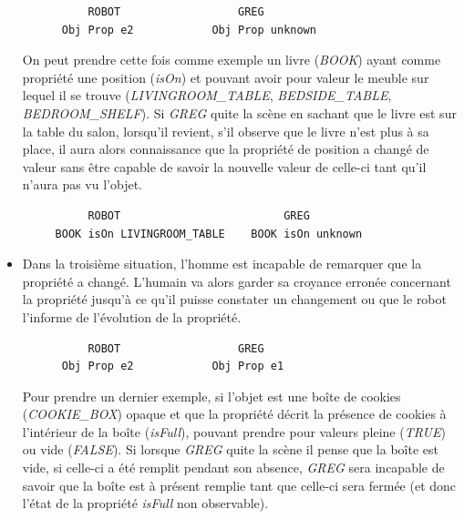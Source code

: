 \documentclass[a4paper,11pt,twoside]{StyleThese}
\begin{document}
\begin{itemize}
\begin{scriptsize}
\begin{verbatim}
          ROBOT                  GREG
      Obj Prop e2            Obj Prop unknown
\end{verbatim}
\end{scriptsize}



On peut prendre cette fois comme exemple un livre (\textit{BOOK}) ayant comme propriété une position (\textit{isOn}) et pouvant avoir pour valeur le meuble sur lequel il se trouve (\textit{LIVINGROOM\_TABLE}, \textit{BEDSIDE\_TABLE}, \textit{BEDROOM\_SHELF}). Si \textit{GREG} quite la scène en sachant que le livre est sur la table du salon, lorsqu'il revient, s'il observe que le livre n'est plus à sa place, il aura alors connaissance que la propriété de position a changé de valeur sans être capable de savoir la nouvelle valeur de celle-ci tant qu'il n'aura pas vu l'objet.

\begin{scriptsize}
\begin{verbatim}
          ROBOT                         GREG
     BOOK isOn LIVINGROOM_TABLE    BOOK isOn unknown
\end{verbatim}
\end{scriptsize}



\item Dans la troisième situation, l'homme est incapable de remarquer que la propriété a changé. L'humain va alors garder sa croyance erronée concernant la propriété jusqu'à ce qu'il puisse constater un changement ou que le robot l'informe de l'évolution de la propriété. 

\begin{scriptsize}
\begin{verbatim}
          ROBOT                  GREG
      Obj Prop e2            Obj Prop e1
\end{verbatim}
\end{scriptsize}

Pour prendre un dernier exemple, si l'objet est une boîte de cookies (\textit{COOKIE\_BOX}) opaque et que la propriété décrit la présence de cookies à l'intérieur de la boîte (\textit{isFull}), pouvant prendre pour valeurs pleine (\textit{TRUE}) ou vide (\textit{FALSE}). Si lorsque \textit{GREG} quite la scène il pense que la boîte est vide, si celle-ci a été remplit pendant son absence, \textit{GREG} sera incapable de savoir que la boîte est à présent remplie tant que celle-ci sera fermée (et donc l'état de la propriété \textit{isFull} non observable).


\end{itemize}
\end{document}
